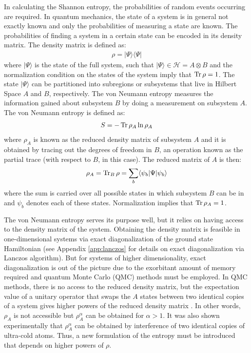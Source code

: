 	In calculating the Shannon entropy, the probabilities of random events occurring are required. In quantum mechanics, the state of a system is in general not exactly known and only the probabilities of measuring a state are known. The probabilities of finding a system in a certain state can be encoded in its density matrix. The density matrix is defined as:	
	\begin{align}
	\label{eq:densityMatrix}
	\rho = \vert \Psi \rangle \langle \Psi \vert
	\end{align}
	where $\vert\Psi\rangle$ is the state of the full system, such that $\vert \Psi \rangle \in \mathcal{H} = A \otimes B$ and the normalization condition on the states of the system imply that $\operatorname{Tr} \rho = 1$. The state $\vert \Psi \rangle$ can be partitioned into subregions or subsystems that live in Hilbert Space $A$ and $B$, respectively. The von Neumann entropy measures the information gained about subsystem $B$ by doing a measurement on subsystem $A$. The von Neumann entropy is defined as:
	\begin{equation}
	S = -\operatorname{Tr}\rho_{A} \ln{\rho_A}
	\label{eq:vonNeumannEntropy}
	\end{equation}
	where $\rho_A$ is known as the reduced density matrix of subsystem $A$ and it is obtained by tracing out the degrees of freedom in $B$, an operation known as the partial trace (with respect to $B$, in this case). The reduced matrix of $A$ is then:
	\begin{equation}
	\rho_{A} = \operatorname{Tr}_B \rho = \sum_b \langle \psi_b \vert \Psi \vert \psi_b \rangle
	\label{eq:partialTrace}
	\end{equation}
	where the sum is carried over all possible states in which subsystem $B$ can be in and $\psi_b$ denotes each of these states. Normalization implies that $\operatorname{Tr} \rho_A = 1$.
	
	The von Neumann entropy serves its purpose well, but it relies on having access to the density matrix of the system. Obtaining the density matrix is feasible in one-dimensional systems via exact diagonalization of the ground state Hamiltonian (see Appendix \ref{app:lanczos} for details on exact diagonalization via Lanczos algorithm). But for systems of higher dimensionality, exact diagonalization is out of the picture due to the exorbitant amount of memory required and quantum Monte Carlo (QMC) methods must be employed. In QMC methods, there is no access to the reduced density matrix, but the expectation value of a unitary operator that swaps the $A$ states between two identical copies of a system gives higher powers of the reduced density matrix \cite{Hastings:2010dc}. In other words, $\rho_{A}$ is not accessible but $\rho_{A}^{\alpha}$ can be obtained for $\alpha > 1$. It was also shown experimentally \cite{Islam:2015cm}  that $\rho_A^{\alpha}$ can be obtained by interference of two identical copies of ultra-cold atoms. Thus, a new formulation of the entropy must be introduced that depends on higher powers of $\rho$.
	
